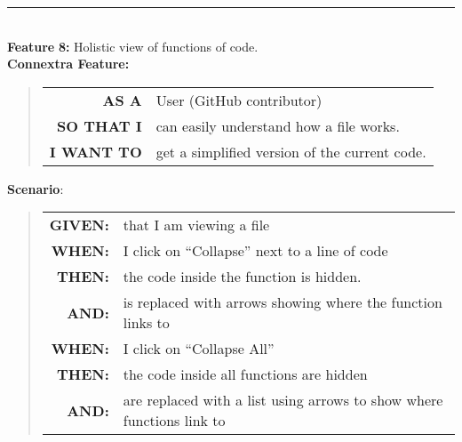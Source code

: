 \documentclass[12pt]{article}
\newcommand{\Feature}[1]{ 
   \noindent \textbf{Feature} #1
}
\newcommand{\CFeature}[4]{
\noindent \textbf{Connextra Feature:}
	\begin{quote}
	\begin{tabular}{rl}
	\textbf{AS A} & #1\\
	\textbf{SO THAT \uppercase{#2}} & #3\\
	\textbf{\uppercase{#2} WANT TO} & #4  
	\end{tabular}
	\end{quote}
}
\newcommand{\GivenSc} {
	\noindent \textbf{GIVEN:}
	}
\newcommand{\WhenSc} {
	\noindent \textbf{WHEN:}
	}
\newcommand{\AndSc} {
	\noindent \textbf{AND:}
	}
\newcommand{\ThenSc} {
	\noindent \textbf{THEN:}
	}
\begin{document}
\begin{framed}
\hrule~\\

\noindent \Feature{\textbf{8:} Holistic view of functions of code.}\\[0.2cm]

\noindent \CFeature{User (\textsf{GitHub} contributor)}{I}{can easily understand how a file works.}{get a simplified version of the current code.}

\noindent \textbf{Scenario}:
\begin{quote}
\begin{tabular}{rl}
\GivenSc & that I am viewing a file\\
\WhenSc & I click on ``Collapse'' next to a line of code\\
\ThenSc & the code inside the function is hidden.\\
\AndSc & is replaced with arrows showing where the function links to\\
\WhenSc & I click on ``Collapse All''\\
\ThenSc & the code inside all functions are hidden\\
\AndSc & are replaced with a list using arrows to show where functions link to
\end{tabular}
\end{quote}
\end{framed}
\end{document}
